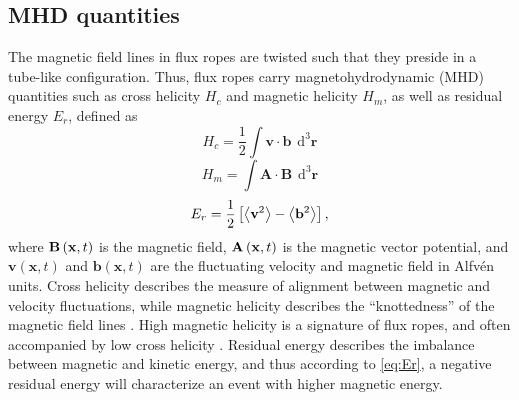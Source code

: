 \subsection{MHD quantities}
The magnetic field lines in flux ropes are twisted such that they preside in a tube-like configuration. Thus, flux ropes carry magnetohydrodynamic (MHD) quantities such as cross helicity $H_c$ and magnetic helicity $H_m$, as well as residual energy $E_r$, defined as
\begin{equation}
    H_c = \frac{1}{2}\int \mathbf{v}\cdot\mathbf{b} \hspace{5pt} \mathrm{d^3} \mathbf{r}
    \label{eq:Hc}
\end{equation}
\begin{equation}
    H_m = \int \mathbf{A}\cdot\mathbf{B} \hspace{5pt} \mathrm{d^3} \mathbf{r}
    \label{eq:Hm}
\end{equation}
\begin{equation}
    E_r = \frac{1}{2} \left[ \left \langle \mathbf{v}^2 \right\rangle  - \left \langle \mathbf{b}^2 \right\rangle \right],
    \label{eq:Er}
\end{equation}
where $\mathbf{B}\left( \mathbf{x},t \right)$ is the magnetic field, $\mathbf{A}\left( \mathbf{x},t \right)$ is the magnetic vector potential, and $\mathbf{v}(\mathbf{x},t)$ and $\mathbf{b}(\mathbf{x},t)$ are the fluctuating velocity and magnetic field in Alfv\'en units. Cross helicity describes the measure of alignment between magnetic and velocity fluctuations, while magnetic helicity describes the “knottedness” of the magnetic field lines \citep{Matthaeus:1982}. High magnetic helicity is a signature of flux ropes, and often accompanied by low cross helicity \citep{Zhao:2020}. Residual energy describes the imbalance between magnetic and kinetic energy, and thus according to \eqref{eq:Er}, a negative residual energy will characterize an event with higher magnetic energy.


